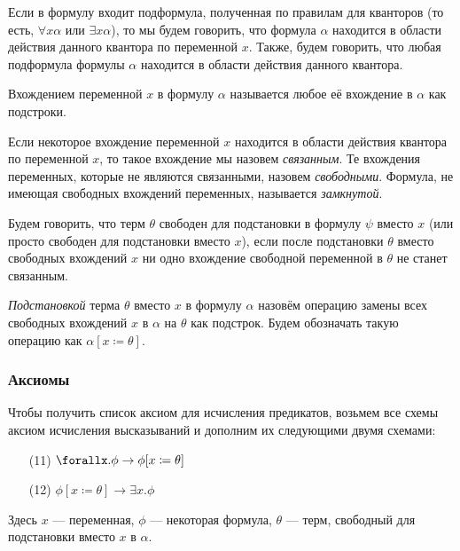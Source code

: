 \begin{definition}Если в формулу входит подформула, полученная по правилам
для кванторов (то есть, $\forall x \alpha$ или $\exists x \alpha$), то 
мы будем говорить, что формула $\alpha$ находится в области действия 
данного квантора по переменной $x$. Также, будем говорить, что любая подформула 
формулы $\alpha$ находится в области действия данного квантора.
\end{definition}

\begin{definition}
Вхождением переменной $x$ в формулу $\alpha$ называется любое её вхождение в $\alpha$ как подстроки.
\end{definition}

\begin{definition}Если некоторое вхождение переменной $x$ находится
в области действия квантора по переменной $x$, то такое вхождение
мы назовем \emph{связанным}. Те вхождения переменных, которые не являются связанными, назовем \emph{свободными}. Формула, не имеющая 
свободных вхождений переменных, называется \emph{замкнутой}.
\end{definition}

\begin{definition}Будем говорить, что терм $\theta$ свободен для
подстановки в формулу $\psi$ вместо $x$ (или просто свободен для 
подстановки вместо $x$), если после подстановки $\theta$ вместо 
свободных вхождений $x$ ни одно вхождение свободной переменной
в $\theta$ не станет связанным.
\end{definition}

\begin{definition}
\emph{Подстановкой} терма $\theta$ вместо $x$ в формулу $\alpha$ назовём операцию замены всех свободных вхождений $x$ в $\alpha$ на $\theta$ как подстрок. Будем обозначать такую операцию как $\alpha[x \coloneqq  \theta]$. 
\end{definition}

\subsubsection*{Аксиомы}
Чтобы получить список аксиом для исчисления предикатов, возьмем все схемы
аксиом исчисления высказываний и дополним их следующими двумя схемами:
\begin{itemize}
    \item[(11)] $\forallx. \phi \rightarrow \phi[x \coloneqq  \theta]$
    \item[(12)] $\phi[x \coloneqq  \theta] \rightarrow \exists x. \phi$
\end{itemize}
Здесь $x$ --- переменная, $\phi$ --- некоторая формула, $\theta$ --- терм, свободный для подстановки вместо $x$ в $\alpha$.

